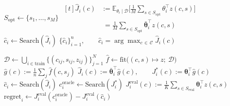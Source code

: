 \documentclass[letterpaper,journal]{IEEEtran}
\newcommand{\E}{\mathbb{E}}
\begin{document}
\begin{algorithm}[H]
\caption{Online optimization}
\label{alg:online}
\begin{algorithmic}[1]
\STATE $S_{\mathrm{opt}} \leftarrow \{s_1, \dots, s_M\}$
  \STATE $\!\begin{aligned}[t]
         \hat J_i(c) &:= \E_{\theta_i \mid \mathcal{D}}\!\Big[
           \tfrac{1}{M} \textstyle\sum_{s \in S_{\mathrm{opt}}}
           \theta_i^{\top} z(c, s) \Big] \\
         &\;= \tfrac{1}{M} \textstyle\sum_{s \in S_{\mathrm{opt}}}
           \bar{\bm\theta}_i^{\top} z(c, s)
         \end{aligned}$
  \STATE $\hat c_i \leftarrow \mathrm{Search}(\hat J_i)$
\ENDFOR
\RETURN $\displaystyle \{\hat c_i\}_{i=1}^{n}, \qquad
        \hat c_i = \arg\max_{c \,\in\, \mathcal{C}} \hat J_i(c)$
\end{algorithmic}
\end{algorithm}

\begin{algorithm}[H]
\caption{Offline optimization and evaluation}
\label{alg:offline}
\begin{algorithmic}[1]
\STATE $\mathcal{D} \leftarrow \bigcup_{i \in \mathrm{train}}
       \{(c_{ij}, s_{ij}, z_{ij})\}_{j=1}^{N}$
\STATE $\hat f \leftarrow \mathrm{fit}\big((c, s) \mapsto z;\ \mathcal{D}\big)$
\STATE $\displaystyle \hat g(c) := \tfrac{1}{n} \sum_{j} \hat f(c, s_j)$
  \STATE $\hat J_i(c) := \bar{\bm\theta}_i^{\top} \hat g(c),
         \qquad J^{*}_i(c) := \bm\theta_i^{\top} \hat g(c)$
  \STATE $\hat c_i \leftarrow \mathrm{Search}(\hat J_i)$
  \STATE $c_i^{\mathrm{oracle}} \leftarrow \mathrm{Search}(J^{*}_i)$
  \STATE $\displaystyle J^{\mathrm{eval}}_i(c) :=
         \tfrac{1}{K} \sum_{s \in S_{\mathrm{eval}}}
         \bm\theta_i^{\top} z(c, s)$
  \STATE $\mathrm{regret}_i \leftarrow
         J^{\mathrm{eval}}_i(c_i^{\mathrm{oracle}}) - J^{\mathrm{eval}}_i(\hat c_i)$
\ENDFOR
\end{algorithmic}
\end{algorithm}
\end{document}
